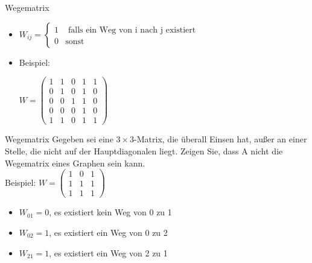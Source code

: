 \begin{frame}{Wegematrix}
  \begin{itemize}
    \item $W_{ij} = \begin{cases}
      1 & \text{ falls ein Weg von i nach j existiert} \\
      0 &  \text{sonst}
    \end{cases}$
    \item Beispiel: \\
    $W=\begin{pmatrix}
      1&1&0&1&1\\
      0&1&0&1&0\\
      0&0&1&1&0\\
      0&0&0&1&0\\
      1&1&0&1&1
    \end{pmatrix}$
  \end{itemize}
\end{frame}

\begin{frame}{Wegematrix}
  Gegeben sei eine $3\times 3$-Matrix, die überall Einsen hat, außer an einer Stelle, die nicht auf der Hauptdiagonalen liegt. Zeigen Sie, dass A nicht die Wegematrix eines Graphen sein kann.\\
  \pause
  Beispiel:
  $W=\begin{pmatrix}
    1&0&1\\
    1&1&1\\
    1&1&1
  \end{pmatrix}$
  \begin{itemize}
    \item $W_{01}=0$, es existiert kein Weg von 0 zu 1
    \item $W_{02}=1$, es existiert ein Weg von 0 zu 2
    \item $W_{21}=1$, es existiert ein Weg von 2 zu 1
  \end{itemize}
\end{frame}

